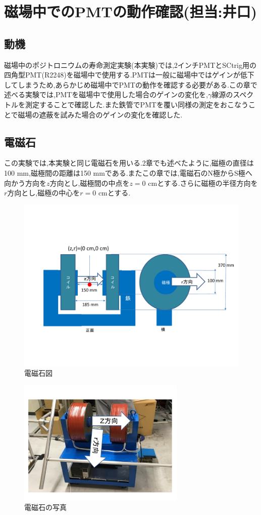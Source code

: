 \chapter{磁場中でのPMTの動作確認(担当:井口)}\label{PMT}


\section{動機}
磁場中のポジトロニウムの寿命測定実験(本実験)では,2インチPMTとSCtrig用の四角型PMT(R2248)\cite{pmtR2248}を磁場中で使用する.PMTは一般に磁場中ではゲインが低下してしまうため,あらかじめ磁場中でPMTの動作を確認する必要がある.この章で述べる実験では,PMTを磁場中で使用した場合のゲインの変化を,$\gamma$線源のスペクトルを測定することで確認した.また鉄管でPMTを覆い同様の測定をおこなうことで磁場の遮蔽を試みた場合のゲインの変化を確認した.


\section{電磁石}
この実験では,本実験と同じ電磁石を用いる.2章でも述べたように,磁極の直径は100 mm,磁極間の距離は150 mmである.またこの章では,電磁石のN極からS極へ向かう方向を$z$方向とし,磁極間の中点を$z=0$ cmとする.さらに磁極の半径方向を$r$方向とし,磁極の中心を$r=0$ cmとする.
\begin{figure}[h!]
	\centering
	\includegraphics[width=13cm]{fig/iguchi/magnetfigure.pdf}
	\caption{電磁石図}
	\label{magfigure}
\end{figure}

\begin{figure}[h!]
	\centering
	\includegraphics[width=8cm]{fig/iguchi/magnetphoto.pdf}
	\caption{電磁石の写真}
	\label{magphoto}
\end{figure}

